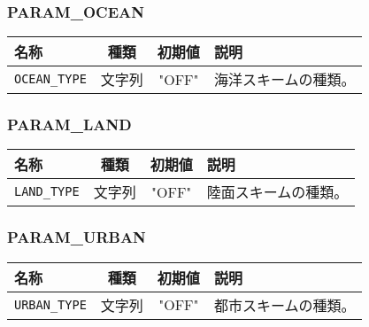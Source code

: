 \subsubsection{PARAM\_OCEAN}
\begin{tabularx}{150mm}{|l|c|c|X|} \hline
 \rowcolor[gray]{0.9} 名称 & 種類 & 初期値 & 説明 \\ \hline
 \verb|OCEAN_TYPE| & 文字列 & "OFF" & 海洋スキームの種類。 \\ \hline
\end{tabularx}


\subsubsection{PARAM\_LAND}
\begin{tabularx}{150mm}{|l|c|c|X|} \hline
 \rowcolor[gray]{0.9} 名称 & 種類 & 初期値 & 説明 \\ \hline
 \verb|LAND_TYPE| & 文字列 & "OFF" & 陸面スキームの種類。 \\ \hline
\end{tabularx}


\subsubsection{PARAM\_URBAN}
\begin{tabularx}{150mm}{|l|c|c|X|} \hline
 \rowcolor[gray]{0.9} 名称 & 種類 & 初期値 & 説明 \\ \hline
 \verb|URBAN_TYPE| & 文字列 & "OFF" & 都市スキームの種類。 \\ \hline
\end{tabularx}


